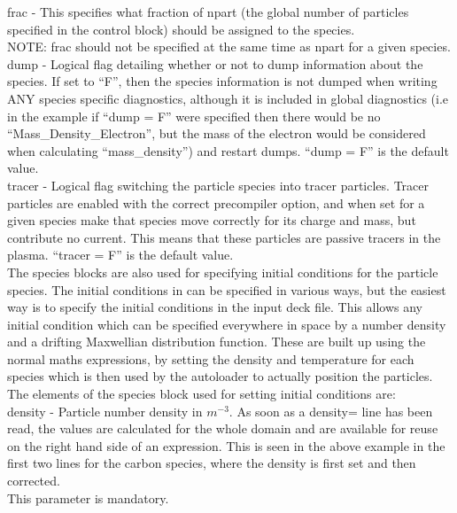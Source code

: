 {\emphtext frac} - This specifies what fraction of npart (the
global number of particles specified in the control block) should be assigned
to the species.\\

{\emphtext NOTE: frac should not be specified at the same time as npart for a
given species.}\\

{\emphtext dump} - Logical flag detailing whether or not to dump
information about the species. If set to ``F'', then the species information
is not dumped when writing ANY species specific diagnostics, although it is
included in global diagnostics (i.e in the example if ``dump = F'' were
specified then there would be no ``Mass\_Density\_Electron'', but the mass of
the electron would be considered when calculating ``mass\_density'') and
restart dumps. ``dump = F'' is the default value.\\

{\emphtext tracer} - Logical flag switching the particle species
into tracer particles. Tracer particles are enabled with the correct
precompiler option, and when set for a given species make that species move
correctly for its charge and mass, but contribute no current. This means that
these particles are passive tracers in the plasma. ``tracer = F'' is the
default value.\\

The species blocks are also used for specifying initial conditions for
the particle species. The initial conditions in {\EPOCH} can be specified in
various ways, but the easiest way is to specify the initial conditions in the
input deck file. This allows any initial condition which can be specified
everywhere in space by a number density and a drifting Maxwellian distribution
function.
These are built up using the normal maths
expressions, by setting the density and temperature for each species which is
then used by the autoloader to actually position the particles. \\
The elements of the species block used for setting
initial conditions are:\\

{\emphtext density} - Particle number density in $m^{-3}$.
As soon as a density= line has been read, the values are
calculated for the whole domain and are available for reuse on the right hand
side of an expression. This is seen in the above example in the first two lines
for the carbon species, where the density is first set and then corrected.\\
This parameter is mandatory.\\

